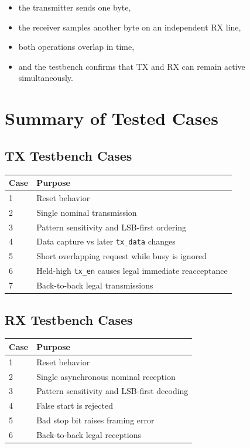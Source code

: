 \documentclass[12pt]{article}
\begin{document}
\begin{itemize}
    \item the transmitter sends one byte,
    \item the receiver samples another byte on an independent RX line,
    \item both operations overlap in time,
    \item and the testbench confirms that TX and RX can remain active
    simultaneously.
\end{itemize}

\section{Summary of Tested Cases}

\subsection*{TX Testbench Cases}

\begin{center}
\begin{tabular}{@{}ll@{}}
\toprule
\textbf{Case} & \textbf{Purpose} \\
\midrule
1 & Reset behavior \\
2 & Single nominal transmission \\
3 & Pattern sensitivity and LSB-first ordering \\
4 & Data capture vs later \texttt{tx\_data} changes \\
5 & Short overlapping request while busy is ignored \\
6 & Held-high \texttt{tx\_en} causes legal immediate reacceptance \\
7 & Back-to-back legal transmissions \\
\bottomrule
\end{tabular}
\end{center}

\subsection*{RX Testbench Cases}

\begin{center}
\begin{tabular}{@{}ll@{}}
\toprule
\textbf{Case} & \textbf{Purpose} \\
\midrule
1 & Reset behavior \\
2 & Single asynchronous nominal reception \\
3 & Pattern sensitivity and LSB-first decoding \\
4 & False start is rejected \\
5 & Bad stop bit raises framing error \\
6 & Back-to-back legal receptions \\
\bottomrule
\end{tabular}
\end{center}
\end{document}
